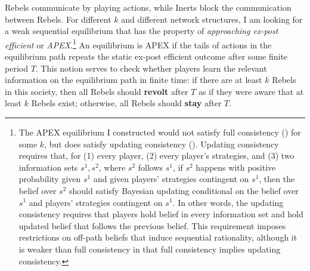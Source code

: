 \documentclass[12pt,letter]{article}
\theoremstyle{definition}
\theoremstyle{remark}
\theoremstyle{claim}
\begin{document}
Rebels communicate by playing actions, while Inerts block the communication between Rebels. For different $k$ and different network structures, I am looking for a weak sequential equilibrium that has the property of \textit{approaching ex-post efficient} or \textit{APEX}.\footnote{The APEX equilibrium I constructed would not satisfy full consistency (\citep{Krep_Wilson1982}) for some $k$, but does satisfy {updating consistency} (\citep{Perea2002}). Updating consistency requires that, for (1) every player, (2) every player's strategies, and (3) two information sets $s^1,s^2$, where $s^2$ follows $s^1$, if $s^2$ happens with positive probability given $s^1$ and given players' strategies contingent on $s^1$, then the belief over $s^2$ should satisfy Bayesian updating conditional on the belief over $s^1$ and players' strategies contingent on $s^1$. In other words, the updating consistency requires that players hold belief in every information set and hold updated belief that follows the previous belief. This requirement imposes restrictions on off-path beliefs that induce sequential rationality, although it is weaker than full consistency in that full consistency implies updating consistency.}
An equilibrium is APEX if the tails of actions in the equilibrium path repeats the static ex-post efficient outcome after some finite period $T$. This notion serves to check whether players learn the relevant information on the equilibrium path in finite time: if there are at least $k$ Rebels in this society, then {all} Rebels should \textbf{revolt} after $T$ as if they were aware that at least $k$ Rebels exist; otherwise, {all} Rebels should \textbf{stay} after $T$. 
\end{document}
